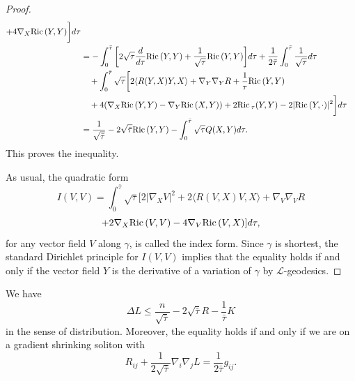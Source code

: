 \begin{proof}
\begin{align*}
+4\nabla_X {\rm Ric}\,(Y,Y)\bigg]d\tau\\
& =-\int_0^{\bar{\tau}}\bigg[2\sqrt{\tau}\frac{d}{d\tau}{\rm Ric}\,(Y,Y)
+\frac{1}{\sqrt{\tau}}{\rm Ric}\,(Y,Y)\bigg]d\tau+\frac{1}{2\bar\tau}
\int_0^{\bar{\tau}}\frac{1}{\sqrt{\tau}}d\tau\\
&\quad +\int_0^{\bar{\tau}}\sqrt{\tau}\bigg[2\langle
R(Y,X)Y,X\rangle
+\nabla_Y\nabla_YR+\frac{1}{\tau}{\rm Ric}\,(Y,Y)\\
&\quad +4(\nabla_X {\rm Ric}\,(Y,Y)-\nabla_Y {\rm Ric}\,(X,Y))+2{\rm Ric}\,_\tau(Y,Y)
-2|{\rm Ric}\,(Y,\cdot)|^2\bigg]d\tau\\
& =\frac{1}{\sqrt{\bar{\tau}}}-2\sqrt{\bar{\tau}}{\rm Ric}\,(Y,Y)
-\int_0^{\bar{\tau}}\sqrt{\tau}Q(X,Y)d\tau.
\end{align*}
This proves the inequality.

As usual, the quadratic form
$$
I(V,V)=\int_0^{\bar{\tau}}\sqrt{\tau}[2 |\nabla_XV|^2 +2\langle
R(V,X)V,X\rangle+\nabla_V\nabla_VR
$$
$$
+2\nabla_X {\rm Ric}\,(V,V)-4\nabla_V {\rm Ric}\,(V,X)]d\tau,
$$
for any vector field $V$ along $\gamma$, is called the index form.
Since $\gamma$ is shortest, the standard Dirichlet principle for
$I(V,V)$ implies that the equality holds if and only if the vector
field $Y$ is the derivative of a variation of $\gamma$ by
$\mathcal{L}$-geodesics.
\end{proof}

\begin{corollary}
  \label{cor:cz-distributional-comparison-for-reduced-distance}
We have
$$
\Delta L\leq\frac{n}{\sqrt{\bar{\tau}}}
-2\sqrt{\bar{\tau}}R-\frac{1}{\bar{\tau}}K
$$
in the sense of distribution. Moreover, the equality holds if and
only if we are on a gradient shrinking soliton with
$$
R_{ij}+\frac{1}{2\sqrt{\bar\tau}}\nabla_i\nabla_jL
=\frac{1}{2\bar\tau}g_{ij}.$$
\end{corollary}

